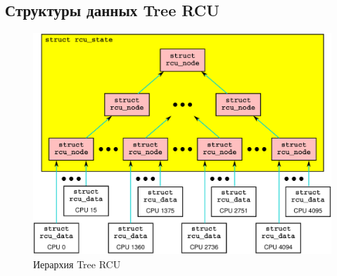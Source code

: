 \subsection{Структуры данных Tree RCU} \label{sec:data_structure}

\begin{figure}[tbp]
\centering
\includegraphics[scale=0.2]{tree_rcu_hierarchy.pdf}
\caption{Иерархия Tree RCU}
\label{fig:tree_rcu_hierarchy}
\end{figure}

